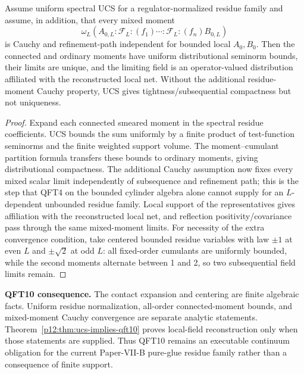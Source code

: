 \documentclass[12pt,a4paper]{article}
\begin{document}
\begin{theorem}
\label{p12:thm:ucs-implies-qft10}
Assume uniform spectral UCS for a regulator-normalized residue family and assume, in addition, that every mixed moment
\[
\omega_L\!\left(A_{0,L}:\!\mathcal F_L\!:(f_1)\cdots:\!\mathcal F_L\!:(f_n)B_{0,L}\right)
\]
is Cauchy and refinement-path independent for bounded local \(A_0,B_0\).  Then the connected and ordinary moments have uniform distributional seminorm bounds, their limits are unique, and the limiting field is an operator-valued distribution affiliated with the reconstructed local net.  Without the additional residue-moment Cauchy property, UCS gives tightness/subsequential compactness but not uniqueness.
\end{theorem}
\begin{proof}
Expand each connected smeared moment in the spectral residue coefficients.  UCS bounds the sum uniformly by a finite product of test-function seminorms and the finite weighted support volume.  The moment--cumulant partition formula transfers these bounds to ordinary moments, giving distributional compactness.  The additional Cauchy assumption now fixes every mixed scalar limit independently of subsequence and refinement path; this is the step that QFT4 on the bounded cylinder algebra alone cannot supply for an \(L\)-dependent unbounded residue family.  Local support of the representatives gives affiliation with the reconstructed local net, and reflection positivity/covariance pass through the same mixed-moment limits.  For necessity of the extra convergence condition, take centered bounded residue variables with law \(\pm1\) at even \(L\) and \(\pm\sqrt2\) at odd \(L\): all fixed-order cumulants are uniformly bounded, while the second moments alternate between 1 and 2, so two subsequential field limits remain.
\end{proof}


\textbf{QFT10 consequence.}
The contact expansion and centering are finite algebraic facts.  Uniform residue normalization, all-order connected-moment bounds, and mixed-moment Cauchy convergence are separate analytic statements.  Theorem~\ref{p12:thm:ucs-implies-qft10} proves local-field reconstruction only when those statements are supplied.  Thus QFT10 remains an executable continuum obligation for the current Paper-VII-B pure-glue residue family rather than a consequence of finite support.
\end{document}
